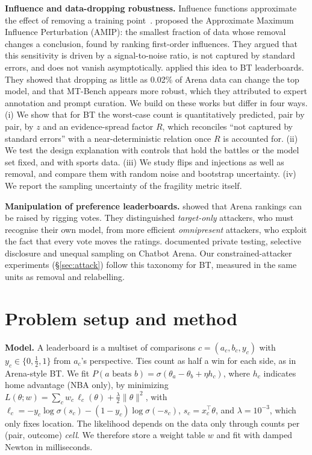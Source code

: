 \documentclass{article}
\begin{document}
\textbf{Influence and data-dropping robustness.} Influence functions approximate the effect of removing a training point~\citep{koh2017understanding}. \citet{broderick2020automatic} proposed the Approximate Maximum Influence Perturbation (AMIP): the smallest fraction of data whose removal changes a conclusion, found by ranking first-order influences. They argued that this sensitivity is driven by a signal-to-noise ratio, is not captured by standard errors, and does not vanish asymptotically. \citet{huang2025dropping} applied this idea to BT leaderboards. They showed that dropping as little as 0.02\% of Arena data can change the top model, and that MT-Bench appears more robust, which they attributed to expert annotation and prompt curation. We build on these works but differ in four ways. (i) We show that for BT the worst-case count is quantitatively predicted, pair by pair, by $z$ and an evidence-spread factor $R$, which reconciles ``not captured by standard errors'' with a near-deterministic relation once $R$ is accounted for. (ii) We test the design explanation with controls that hold the battles or the model set fixed, and with sports data. (iii) We study flips and injections as well as removal, and compare them with random noise and bootstrap uncertainty. (iv) We report the sampling uncertainty of the fragility metric itself.

\textbf{Manipulation of preference leaderboards.} \citet{min2025improving} showed that Arena rankings can be raised by rigging votes. They distinguished \emph{target-only} attackers, who must recognise their own model, from more efficient \emph{omnipresent} attackers, who exploit the fact that every vote moves the ratings. \citet{singh2025leaderboard} documented private testing, selective disclosure and unequal sampling on Chatbot Arena. Our constrained-attacker experiments (\S\ref{sec:attack}) follow this taxonomy for BT, measured in the same units as removal and relabelling.

\section{Problem setup and method}\label{sec:method}

\textbf{Model.} A leaderboard is a multiset of comparisons $c=(a_c,b_c,y_c)$ with $y_c\in\{0,\tfrac12,1\}$ from $a_c$'s perspective. Ties count as half a win for each side, as in Arena-style BT. We fit $P(a \text{ beats } b)=\sigma(\theta_a-\theta_b+\eta h_c)$, where $h_c$ indicates home advantage (NBA only), by minimizing
$L(\theta;w)=\sum_c w_c\,\ell_c(\theta)+\tfrac{\lambda}{2}\|\theta\|^2$, with $\ell_c=-y_c\log\sigma(s_c)-(1-y_c)\log\sigma(-s_c)$, $s_c=x_c^\top\theta$, and $\lambda=10^{-3}$, which only fixes location. The likelihood depends on the data only through counts per (pair, outcome) \emph{cell}. We therefore store a weight table $w$ and fit with damped Newton in milliseconds.
\end{document}
